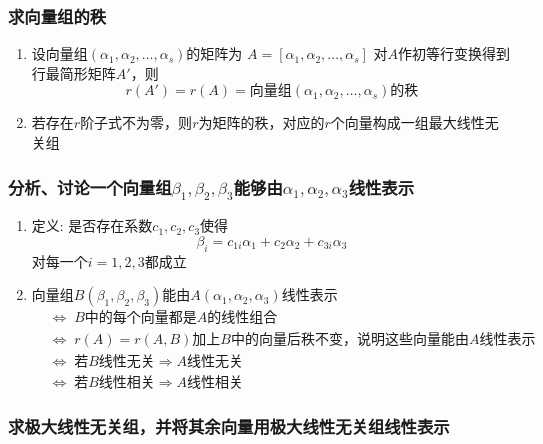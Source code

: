 \documentclass[./linear_algebra.tex]{subfiles}
\begin{document}
    \subsubsection{求向量组的秩}

    \begin{enumerate}
        \item 设向量组$(\alpha_1, \alpha_2, \dots, \alpha_s)$的矩阵为 $A = [\alpha_1, \alpha_2, \dots, \alpha_s]$ 对$A$作初等行变换得到行最简形矩阵$A'$，则
        \[
            r(A') = r(A) = \text{向量组}(\alpha_1, \alpha_2, \dots, \alpha_s)\text{的秩}
        \]
        \item 若存在$r$阶子式不为零，则$r$为矩阵的秩，对应的$r$个向量构成一组最大线性无关组
    \end{enumerate}

    \subsubsection{分析、讨论一个向量组$\beta_1, \beta_2, \beta_3$能够由$\alpha_1, \alpha_2, \alpha_3$线性表示}

    \begin{enumerate}
        \item 定义: 是否存在系数$c_1, c_2, c_3$使得
        \[
            \beta_i = c_{1i}\alpha_1 + c_{2}\alpha_2 + c_{3i}\alpha_3
        \]对每一个$i = 1, 2, 3$都成立
        \item 向量组$B(\beta_1, \beta_2, \beta_3)$能由$A(\alpha_1, \alpha_2, \alpha_3)$线性表示
        \begin{align*}
            &\Leftrightarrow\; B\text{中的每个向量都是}A\text{的线性组合} \\
            &\Leftrightarrow\; r(A) = r(A, B) \text{加上}B\text{中的向量后秩不变，说明这些向量能由}A\text{线性表示} \\
            &\Leftrightarrow\; \text{若}B\text{线性无关} \Rightarrow A\text{线性无关} \\
            &\Leftrightarrow\; \text{若}B\text{线性相关} \Rightarrow A\text{线性相关}
        \end{align*}
    \end{enumerate}

    \subsubsection{求极大线性无关组，并将其余向量用极大线性无关组线性表示}
\end{document}
